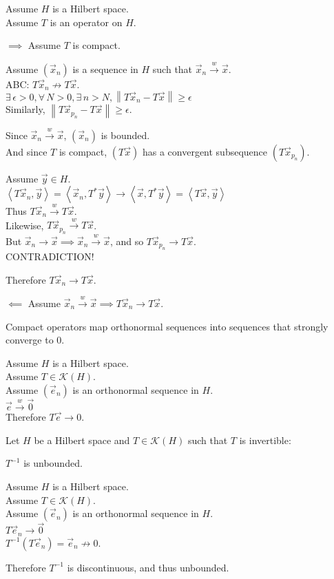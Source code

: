 \documentclass[letterpaper,12pt,fleqn]{article}
\newcommand{\ve}{\vec{e}}
\newcommand{\vx}{\vec{x}}
\newcommand{\vy}{\vec{y}}
\newcommand{\vo}{\vec{0}}
\newcommand{\norm}[1]{\left\|#1\right\|}
\newcommand{\inner}[1]{\left<#1\right>}
\newcommand{\e}{\epsilon}
\newcommand{\mk}{\mathcal{K}}
\newcommand{\weak}{\overset{w}{\longrightarrow}}
\begin{document}
\begin{theproof}
  Assume $H$ is a Hilbert space. \\
  Assume $T$ is an operator on $H$.
  \begin{description}
  \item $\implies$ Assume $T$ is compact.

    Assume $(\vx_n)$ is a sequence in $H$ such that $\vx_n\weak\vx$. \\
    ABC: $T\vx_n\not\to T\vx$. \\
    $\exists\,\e>0,\forall\,N>0,\exists\,n>N,\norm{T\vx_n-T\vx}\ge\e$ \\
    Similarly, $\norm{T\vx_{p_n}-T\vx}\ge\e$.

    Since $\vx_n\weak\vx$, $(\vx_n)$ is bounded. \\
    And since $T$ is compact, $(T\vx)$ has a convergent subsequence
    $(T\vx_{p_n})$.

    Assume $\vy\in H$. \\
    $\inner{T\vx_n,\vy}=\inner{\vx_n,T^*\vy}\to\inner{\vx,T^*\vy}=
    \inner{T\vx,\vy}$ \\
    Thus $T\vx_n\weak T\vx$. \\
    Likewise, $T\vx_{p_n}\weak T\vx$. \\
    But $\vx_n\to\vx\implies\vx_n\weak\vx$, and so $T\vx_{p_n}\to T\vx$. \\
    CONTRADICTION!

    Therefore $T\vx_n\to T\vx$.

  \item $\impliedby$ Assume $\vx_n\weak\vx\implies T\vx_n\to T\vx$.

  \end{description}
\end{theproof}

\begin{corollary}
  Compact operators map orthonormal sequences into sequences that strongly
  converge to 0.
\end{corollary}

\begin{theproof}
  Assume $H$ is a Hilbert space. \\
  Assume $T\in\mk(H)$. \\
  Assume $(\ve_n)$ is an orthonormal sequence in $H$. \\
  $\ve\weak\vo$ \\
  Therefore $T\ve\to0$.
\end{theproof}

\begin{corollary}
  Let $H$ be a Hilbert space and $T\in\mk(H)$ such that $T$ is invertible:

  \qquad$T^{-1}$ is unbounded.
\end{corollary}

\begin{theproof}
  Assume $H$ is a Hilbert space. \\
  Assume $T\in\mk(H)$. \\
  Assume $(\ve_n)$ is an orthonormal sequence in $H$. \\
  $T\ve_n\to\vo$ \\
  $T^{-1}(T\ve_n)=\ve_n\not\to0$.

  Therefore $T^{-1}$ is discontinuous, and thus unbounded.
\end{theproof}
\end{document}
